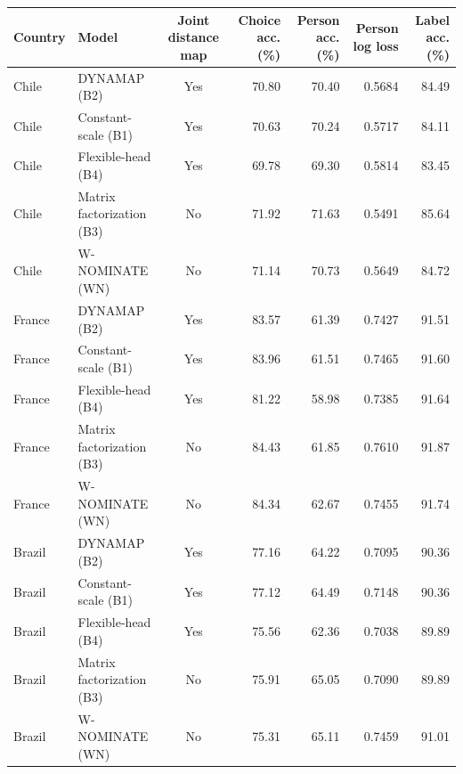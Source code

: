 \begin{tabular}{llcrrrr}
\toprule
Country & Model & Joint distance map & Choice acc. (\%) & Person acc. (\%) & Person log loss & Label acc. (\%) \\
\midrule
Chile & DYNAMAP (B2) & Yes & 70.80 & 70.40 & 0.5684 & 84.49 \\
Chile & Constant-scale (B1) & Yes & 70.63 & 70.24 & 0.5717 & 84.11 \\
Chile & Flexible-head (B4) & Yes & 69.78 & 69.30 & 0.5814 & 83.45 \\
Chile & Matrix factorization (B3) & No & 71.92 & 71.63 & 0.5491 & 85.64 \\
Chile & W-NOMINATE (WN) & No & 71.14 & 70.73 & 0.5649 & 84.72 \\
France & DYNAMAP (B2) & Yes & 83.57 & 61.39 & 0.7427 & 91.51 \\
France & Constant-scale (B1) & Yes & 83.96 & 61.51 & 0.7465 & 91.60 \\
France & Flexible-head (B4) & Yes & 81.22 & 58.98 & 0.7385 & 91.64 \\
France & Matrix factorization (B3) & No & 84.43 & 61.85 & 0.7610 & 91.87 \\
France & W-NOMINATE (WN) & No & 84.34 & 62.67 & 0.7455 & 91.74 \\
Brazil & DYNAMAP (B2) & Yes & 77.16 & 64.22 & 0.7095 & 90.36 \\
Brazil & Constant-scale (B1) & Yes & 77.12 & 64.49 & 0.7148 & 90.36 \\
Brazil & Flexible-head (B4) & Yes & 75.56 & 62.36 & 0.7038 & 89.89 \\
Brazil & Matrix factorization (B3) & No & 75.91 & 65.05 & 0.7090 & 89.89 \\
Brazil & W-NOMINATE (WN) & No & 75.31 & 65.11 & 0.7459 & 91.01 \\
\bottomrule
\end{tabular}

